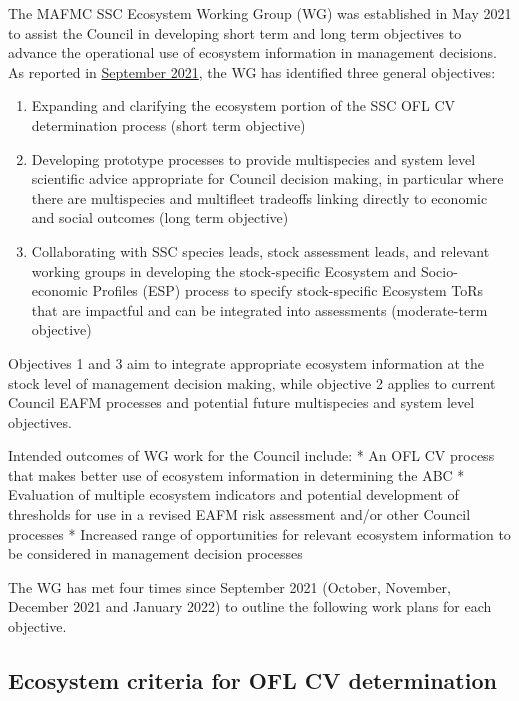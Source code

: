 \documentclass[
  10pt,
]{article}
\author{}
\date{\vspace{-2.5em}}
\providecommand{\tightlist}{%
  \setlength{\itemsep}{0pt}\setlength{\parskip}{0pt}}
\begin{document}
The MAFMC SSC Ecosystem Working Group (WG) was established in May 2021
to assist the Council in developing short term and long term objectives
to advance the operational use of ecosystem information in management
decisions. As reported in
\href{https://www.mafmc.org/s/b_Ecosystem-WG_Proposed-Tasks-August-2021.pdf}{September
2021}, the WG has identified three general objectives:

\begin{enumerate}
\def\labelenumi{\arabic{enumi}.}
\tightlist
\item
  Expanding and clarifying the ecosystem portion of the SSC OFL CV
  determination process (short term objective)
\item
  Developing prototype processes to provide multispecies and system
  level scientific advice appropriate for Council decision making, in
  particular where there are multispecies and multifleet tradeoffs
  linking directly to economic and social outcomes (long term objective)
\item
  Collaborating with SSC species leads, stock assessment leads, and
  relevant working groups in developing the stock-specific Ecosystem and
  Socio-economic Profiles (ESP) process to specify stock-specific
  Ecosystem ToRs that are impactful and can be integrated into
  assessments (moderate-term objective)
\end{enumerate}

Objectives 1 and 3 aim to integrate appropriate ecosystem information at
the stock level of management decision making, while objective 2 applies
to current Council EAFM processes and potential future multispecies and
system level objectives.

Intended outcomes of WG work for the Council include: * An OFL CV
process that makes better use of ecosystem information in determining
the ABC * Evaluation of multiple ecosystem indicators and potential
development of thresholds for use in a revised EAFM risk assessment
and/or other Council processes * Increased range of opportunities for
relevant ecosystem information to be considered in management decision
processes

The WG has met four times since September 2021 (October, November,
December 2021 and January 2022) to outline the following work plans for
each objective.

\hypertarget{ecosystem-criteria-for-ofl-cv-determination}{%
\subsection{Ecosystem criteria for OFL CV
determination}\label{ecosystem-criteria-for-ofl-cv-determination}}
\end{document}
